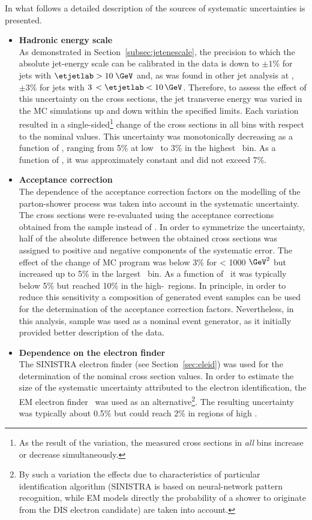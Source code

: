 In what follows a detailed description of the sources of systematic uncertainties is presented.
\begin{itemize}
	\item \textbf{Hadronic energy scale} \\
		As demonstrated in Section~\ref{subsec:jetenescale}, the precision to which the absolute jet-energy scale can be calibrated in the data is down to $\pm1\%$ for jets with $\etjetlab > 10\;\GeV$ and, as was found in other jet analysis at \zeus, $\pm3\%$ for jets with $3\,< \etjetlab < 10\,\GeV$. Therefore, to assess the effect of this uncertainty on the cross sections, the jet transverse energy was varied in the MC simulations up and down within the specified limits. Each variation resulted in a single-sided\footnote{As the result of the variation, the measured cross sections in \textit{all} bins increase or decrease simultaneously.} change of the cross sections in all bins with respect to the nominal values. This uncertainty was monotonically decreasing as a function of \qsq, ranging from 5\% at low \qsq~to 3\% in the highest \qsq~bin. As a function of \etjetb, it was approximately constant and did not exceed 7\%.
		
	\item \textbf{Acceptance correction} \\
		The dependence of the acceptance correction factors on the modelling of the parton-shower process was taken into account in the systematic uncertainty. The cross sections were re-evaluated using the acceptance corrections obtained from the \ariadne sample instead of \lepto. In order to symmetrize the uncertainty, half of the absolute difference between the obtained cross sections was assigned to positive and negative components of the systematic error. The effect of the change of MC program was below 3\% for \qsq < 1000 $\GeV^2$ but increased up to 5\% in the largest \qsq~bin. As a function of \etjetb~it was typically below 5\% but reached 10\% in the high-\etjetb~regions.
In principle, in order to reduce this sensitivity a composition of generated event samples can be used for the determination of the acceptance correction factors. Nevertheless, in this analysis, \lepto sample was used as a nominal event generator, as it initially provided better description of the data.
			
	\item \textbf{Dependence on the electron finder}\\
		The \textsc{SINISTRA} electron finder (see Section~\ref{sec:eleid}) was used for the determination of the nominal cross section values. In order to estimate the size of the systematic uncertainty attributed to the electron identification, the \textsc{EM} electron finder~\cite{epj:c11:427,upub:Straub:url} was used as an alternative\footnote{By such a variation the effects due to characteristics of particular identification algorithm (SINISTRA is based on neural-network pattern recognition, while EM models directly the probability of a shower to originate from the DIS electron candidate) are taken into account.}. The resulting uncertainty was typically about 0.5\% but could reach 2\% in regions of high \qsq.
	

\end{itemize}
